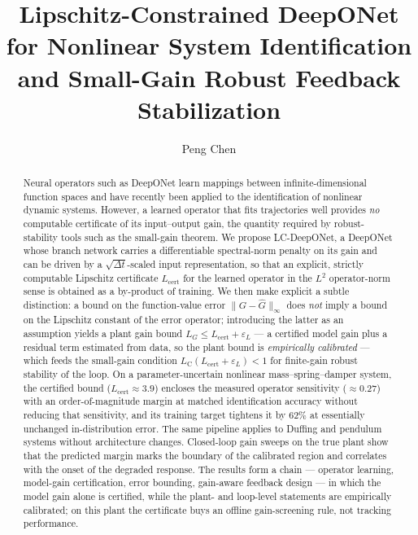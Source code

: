 \documentclass[11pt,sagev,times]{sagej}
\title{Lipschitz-Constrained DeepONet for Nonlinear System Identification and Small-Gain Robust Feedback Stabilization}
\author{Peng Chen}
\affiliation{School of Computer Science, Xinyang University,
Xinyang 464000, Henan, China}
\newcommand{\Ltwo}{L^2}
\newcommand{\Ghat}{\hat{G}}
\newcommand{\Lhat}{L_{\mathrm{cert}}}
\newcommand{\epsL}{\varepsilon_L}
\newcommand{\LC}{L_{\mathrm{C}}}
\begin{document}
\begin{abstract}
Neural operators such as DeepONet learn mappings between infinite-dimensional
function spaces and have recently been applied to the identification of
nonlinear dynamic systems. However, a learned operator that fits trajectories well
provides \emph{no} computable certificate of its input--output gain, the
quantity required by robust-stability tools such as the small-gain theorem. We propose LC-DeepONet, a DeepONet whose
branch network carries a differentiable spectral-norm penalty on its gain and can be driven by a
$\sqrt{\Delta t}$-scaled input representation, so that an explicit, strictly
computable Lipschitz certificate $\Lhat$ for the learned operator in the
$\Ltwo$ operator-norm sense is obtained as a by-product of training. We then
make explicit a subtle distinction: a bound on the function-value error
$\|G-\Ghat\|_\infty$ does \emph{not} imply a bound on the Lipschitz constant
of the error operator; introducing the latter as an assumption yields a plant
gain bound $L_G\le \Lhat+\epsL$ --- a certified model gain plus a residual
term estimated from data, so the plant bound is \emph{empirically calibrated}
--- which feeds the small-gain condition $\LC(\Lhat+\epsL)<1$ for finite-gain
robust stability of the loop. On a parameter-uncertain nonlinear mass--spring--damper
system, the certified bound ($\Lhat\approx3.9$) encloses the measured
operator sensitivity ($\approx0.27$) with an order-of-magnitude margin at
matched identification accuracy without reducing that sensitivity, and its
training target tightens it by $62\%$ at essentially unchanged in-distribution
error. The same pipeline applies to Duffing and pendulum systems without
architecture changes. Closed-loop gain sweeps on the true plant show that the
predicted margin marks the boundary of the calibrated region and correlates
with the onset of the degraded response. The results form a chain --- operator
learning, model-gain certification, error bounding, gain-aware feedback
design --- in which the model gain alone is certified, while the plant- and
loop-level statements are empirically calibrated; on this plant the certificate
buys an offline gain-screening rule, not tracking performance.
\end{abstract}


\maketitle
\end{document}
